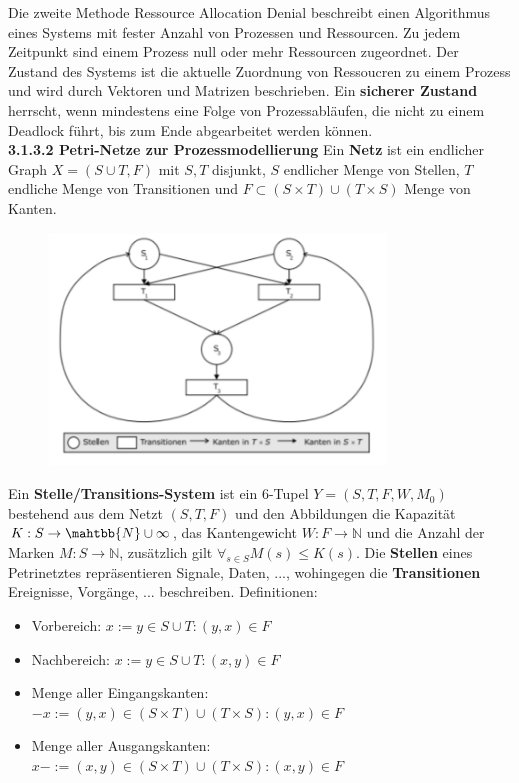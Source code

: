 \documentclass{article}
\begin{document}
    Die zweite Methode {Ressource Allocation Denial} beschreibt einen Algorithmus eines Systems mit fester Anzahl von Prozessen und Ressourcen. Zu jedem Zeitpunkt sind einem Prozess null oder mehr Ressourcen zugeordnet. Der Zustand des Systems ist die aktuelle Zuordnung von Ressoucren zu einem Prozess und wird durch Vektoren und Matrizen beschrieben. Ein \textbf{sicherer Zustand} herrscht, wenn mindestens eine Folge von Prozessabläufen, die nicht zu einem Deadlock führt, bis zum Ende abgearbeitet werden können.\newline  
    \\
    \textbf{3.1.3.2 Petri-Netze zur Prozessmodellierung}\newline
    Ein \textbf{Netz} ist ein endlicher Graph $X=(S\cup T, F)$ mit $S, T$ disjunkt, $S$ endlicher Menge von Stellen, $T$ endliche Menge von Transitionen und $F\subset (S\times T)\cup (T\times S)$ Menge von Kanten.
    \begin{figure}[h]
        \centering
	    \includegraphics[width=90mm]{Skizzen/3_Kapitel/Beispiel_Petrinetz.png}
    \end{figure}\newline
    Ein \textbf{Stelle/Transitions-System} ist ein 6-Tupel $Y=(S,T,F,W,M_0)$ bestehend aus dem Netzt $(S,T,F)$ und den Abbildungen die Kapazität $K:S\rightarrow \mahtbb{N} \cup {\infty}$, das Kantengewicht $W:F\rightarrow \mathbb{N}$ und die Anzahl der Marken $M:S\rightarrow \mathbb{N}$, zusätzlich gilt $\forall_{s\in S} M(s)\leq K(s)$.\newline
    Die \textbf{Stellen} eines Petrinetztes repräsentieren Signale, Daten, ..., wohingegen die \textbf{Transitionen} Ereignisse, Vorgänge, ... beschreiben.\newline
    Definitionen:
    \begin{itemize}
        \item Vorbereich: $x:= {y\in S\cup T:(y,x)\in F}$
        \item Nachbereich: $x:= {y\in S\cup T:(x,y)\in F}$
        \item Menge aller Eingangskanten: $-x:= {(y,x)\in (S\times T)\cup (T\times S):(y,x)\in F}$
        \item Menge aller Ausgangskanten: $x-:= {(x,y)\in (S\times T)\cup (T\times S):(x,y)\in F}$
    \end{itemize}\newline
\end{document}
